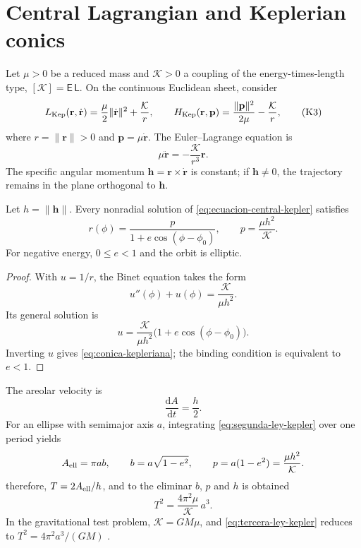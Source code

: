 \section{Central Lagrangian and Keplerian conics}
\label{sec:lagrangiano-central-kepler}

Let \(\mu>0\) be a reduced mass and
\(\mathcal K>0\) a coupling of the energy-times-length type,
\([\mathcal K]=\mathsf E\,\mathsf L\). On the continuous
Euclidean sheet, consider
\[
 L_{\rm Kep}(\mathbf r,\dot{\mathbf r})
 =\frac{\mu}{2}\|\dot{\mathbf r}\|^2+\frac{\mathcal K}{r},
 \qquad
 H_{\rm Kep}(\mathbf r,\mathbf p)
 =\frac{\|\mathbf p\|^2}{2\mu}-\frac{\mathcal K}{r},
 \tag{K3}\label{eq:lagrangiano-hamiltoniano-kepler}
\]
where \(r=\|\mathbf r\|>0\) and
\(\mathbf p=\mu\dot{\mathbf r}\). The Euler--Lagrange equation is
\[
 \mu\ddot{\mathbf r}
 =-\frac{\mathcal K}{r^3}\mathbf r.
 \tag{K4}\label{eq:ecuacion-central-kepler}
\]
The specific angular momentum
\(\mathbf h=\mathbf r\times\dot{\mathbf r}\) is constant; if
\(\mathbf h\ne0\), the trajectory remains in the plane orthogonal to
\(\mathbf h\).

\begin{proposition}
\label{prop:conica-kepleriana-hmt-md}
Let \(h=\|\mathbf h\|\). Every nonradial solution of
\eqref{eq:ecuacion-central-kepler} satisfies
\[
 r(\phi)
 =\frac{p}{1+e\cos(\phi-\phi_0)},
 \qquad
 p=\frac{\mu h^2}{\mathcal K}.
 \tag{K5}\label{eq:conica-kepleriana}
\]
For negative energy, \(0\leq e<1\) and the orbit is elliptic.
\end{proposition}

\begin{proof}
With \(u=1/r\), the Binet equation takes the form
\[
 u''(\phi)+u(\phi)=\frac{\mathcal K}{\mu h^2}.
\]
Its general solution is
\[
 u=\frac{\mathcal K}{\mu h^2}
 \bigl(1+e\cos(\phi-\phi_0)\bigr).
\]
Inverting \(u\) gives \eqref{eq:conica-kepleriana}; the binding condition
is equivalent to \(e<1\).
\end{proof}

The areolar velocity is
\[
 \frac{\mathrm dA}{\mathrm dt}=\frac h2.
 \tag{K6}\label{eq:segunda-ley-kepler}
\]
For an ellipse with semimajor axis \(a\), integrating
\eqref{eq:segunda-ley-kepler} over one period yields
\[
 A_{\rm ell}=\pi ab,
 \qquad
 b=a\sqrt{1-e^2},
 \qquad
 p=a(1-e^2)=\frac{\mu h^2}{\mathcal K}.
\]
therefore,
\(T=2A_{\rm ell}/h\), and to the eliminar \(b\), \(p\) and \(h\) is obtained
\[
 T^2=\frac{4\pi^2\mu}{\mathcal K}\,a^3.
 \tag{K7}\label{eq:tercera-ley-kepler}
\]
In the gravitational test problem,
\(\mathcal K=G M\mu\), and
\eqref{eq:tercera-ley-kepler} reduces to
\(T^2=4\pi^2a^3/(GM)\) \cite{Kepler1609,Newton1687}.

